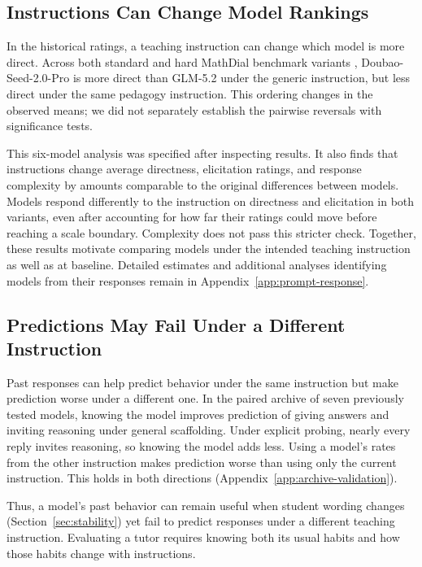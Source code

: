 \subsection{Instructions Can Change Model Rankings}

In the historical ratings, a teaching instruction can change which model is
more direct. Across both
standard and hard MathDial benchmark variants \citep{macina2025mathtutorbench},
Doubao-Seed-2.0-Pro is more direct than
GLM-5.2 under the generic instruction, but less direct under the same pedagogy
instruction. This ordering changes in the observed means; we did not separately establish
the pairwise reversals with significance tests.

This six-model analysis was specified after inspecting results. It also finds
that instructions change average directness, elicitation ratings, and response
complexity by amounts comparable to the original differences between models. Models respond differently to the instruction on directness and elicitation
in both variants, even after accounting for how far their ratings could move
before reaching a scale boundary. Complexity does not pass this stricter check.
Together, these results motivate comparing models under the intended teaching
instruction as well as at baseline. Detailed estimates and additional
analyses identifying models from their responses remain in Appendix~\ref{app:prompt-response}.

\subsection{Predictions May Fail Under a Different Instruction}

Past responses can help predict behavior under the same instruction but make
prediction worse under a different one.
In the paired archive of seven previously tested models, knowing the model improves prediction of giving answers and inviting reasoning under
general scaffolding. Under explicit probing, nearly every reply invites
reasoning, so knowing the model adds less. Using a model's rates from the other
instruction makes prediction worse than using only the current instruction.
This holds in both directions
(Appendix~\ref{app:archive-validation}).

Thus, a model's past behavior can remain useful when student wording changes
(Section~\ref{sec:stability}) yet fail to predict responses under a different
teaching instruction. Evaluating a tutor requires knowing both its usual habits
and how those habits change with instructions.

